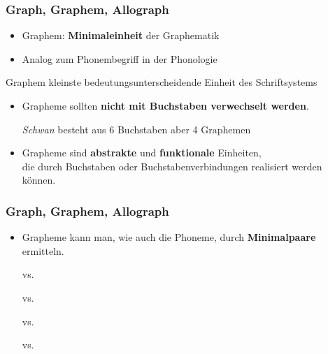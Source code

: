 \begin{frame}
\frametitle{Graph, Graphem, Allograph}

\begin{itemize}
	\item Graphem: \textbf{Minimaleinheit} der Graphematik

	\item Analog zum Phonembegriff in der Phonologie
\end{itemize}

\begin{block}{Graphem}
kleinste bedeutungsunterscheidende Einheit des Schriftsystems
\end{block}

\pause 

\begin{itemize}
	\item Grapheme sollten \textbf{nicht mit Buchstaben verwechselt werden}.

	\ea \emph{Schwan} besteht aus 6 Buchstaben aber 4 Graphemen
	\z 
	 	
	\item Grapheme sind \textbf{abstrakte} und \textbf{funktionale} Einheiten,\\
	die durch Buchstaben oder Buchstabenverbindungen realisiert werden können.
\end{itemize}

\end{frame}


\begin{frame}
\frametitle{Graph, Graphem, Allograph}

\begin{itemize}
	\item Grapheme kann man, wie auch die Phoneme, durch \textbf{Minimalpaare} ermitteln.
	
	\pause
	 
\settowidth{} 

	\ea {} vs.  
	
	\ex {} vs.  
	
	\ex {} vs.  
	
	\ex {} vs.  
	\z
\end{itemize}

\end{frame}


